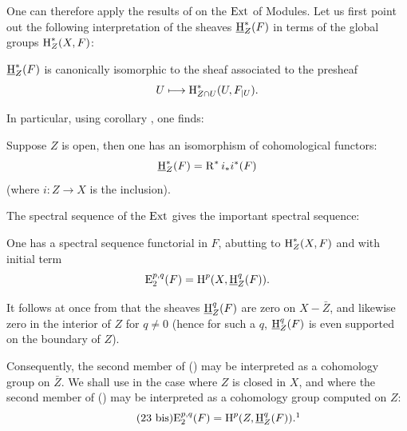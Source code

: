 One can therefore apply the results of \cite{Tohoku} on the $\operatorname{Ext}$ of Modules. Let us first point out the following interpretation of the sheaves $\operatorname{\underline{H}}_Z^*(F)$ in terms of the global groups $\operatorname{H}_Z^*(X, F)$:

\begin{corollary} \label{I.2.4}
$\operatorname{\underline{H}}_Z^*(F)$ is canonically isomorphic to the sheaf associated to the presheaf
$$
U \mto \H^*_{Z\cap U}(U, F\rest{U}).
$$
\end{corollary}

In particular, using corollary , one finds:

\begin{corollary} \label{I.2.5}
Suppose $Z$ is open, then one has an isomorphism of cohomological functors:
\begin{equation} \label{eq:I.22} {\operatorname{\underline{H}}_Z^*(F)=\operatorname{R}^*i_*i^*(F)}
\end{equation}
(where $i: Z \to X$ is the inclusion).
\end{corollary}

The spectral sequence of the $\operatorname{Ext}$ gives the important spectral sequence:

\begin{theorem} \label{I.2.6} One has a spectral sequence functorial in $F$, abutting to $\operatorname{H}_Z^*(X, F)$ and with initial term
\begin{equation} \label{eq:I.23} { \operatorname{E}_2^{p, q}(F)=\operatorname{H}^p(X, \operatorname{\underline{H}}_Z^q(F))}.
\end{equation}
\end{theorem}

\setcounter{equation}{22}

\begin{remarks} \label{I.2.7} It follows at once from  that the sheaves $\operatorname{\underline{H}}_Z^q(F)$ are zero on $X-\bar{Z}$, and likewise zero in the interior of $Z$ for $q\neq 0$ (hence for such a $q$, $\operatorname{\underline{H}}_Z^q(F)$ is even supported on the boundary of $Z$).

Consequently, the second member of () may be interpreted as a cohomology group on $\bar{Z}$. We shall use  in the case where $Z$ is closed in $X$, and where the second member of () may be interpreted as a cohomology group computed on $Z$:
\begin{equation} \label{eq:I.23bis}\tag{23 bis} {\E_2^{p, q}(F) = \H^p(Z, \SheafH_Z^q(F))}.\nde{the equation was numbered (23) in the original edition.}
\end{equation}
\end{remarks}
\setcounter{equation}{23}

